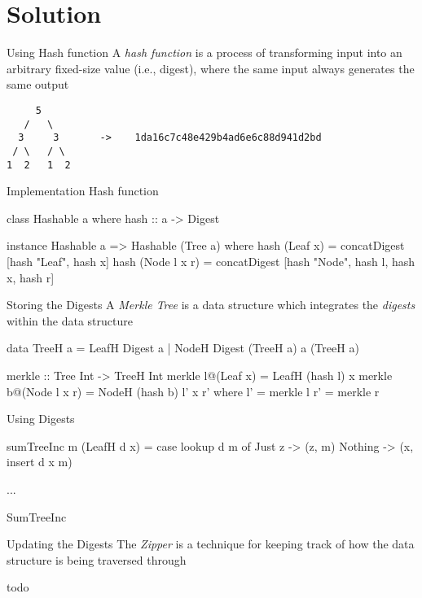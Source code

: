 \section{Solution}

\begin{slide}{Using Hash function}
A \textit{hash function} is a process of transforming input into an arbitrary fixed-size value (i.e., digest), where the same input always generates the same output

\begin{center}
\begin{verbatim}
     5 
   /   \
  3     3       ->    1da16c7c48e429b4ad6e6c88d941d2bd
 / \   / \
1  2   1  2
\end{verbatim}
\end{center}
\end{slide}

\begin{slide}{Implementation Hash function}
\begin{haskell}
class Hashable a where
  hash :: a -> Digest

instance Hashable a => Hashable (Tree a) where
  hash (Leaf x)     = concatDigest [hash "Leaf", hash x]
  hash (Node l x r) = concatDigest [hash "Node", hash l, hash x, hash r]
\end{haskell}
\end{slide}

\begin{slide}{Storing the Digests}
A \textit{Merkle Tree} is a data structure which integrates the \textit{digests} within the data structure

\vspace*{0.4cm}
\begin{haskell}
data TreeH a = LeafH Digest a
             | NodeH Digest (TreeH a) a (TreeH a)


merkle :: Tree Int -> TreeH Int
merkle l@(Leaf x)     = LeafH (hash l) x
merkle b@(Node l x r) = NodeH  (hash b) l' x r'
  where
    l' = merkle l
    r' = merkle r
\end{haskell}
\end{slide}

\begin{slide}{Using Digests} 
\begin{haskell}
sumTreeInc m (LeafH d x) = case lookup d m of
  Just z  -> (z, m)
  Nothing -> (x, insert d x m)

...
\end{haskell}

\begin{haskell}
SumTreeInc 
\end{haskell}
\end{slide}

\begin{slide}{Updating the Digests}
The \textit{Zipper} is a technique for keeping track of how the data structure is being traversed through

\begin{haskell}
todo
\end{haskell}
\end{slide}